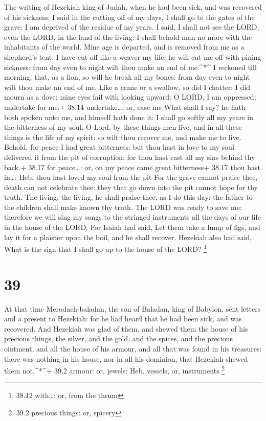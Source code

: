  The writing of Hezekiah king of Judah, when he had been
sick, and was recovered of his sickness:  I said in the
cutting off of my days, I shall go to the gates of the grave: I am
deprived of the residue of my years.  I said, I shall not
see the LORD, even the LORD, in the land of the living: I shall behold
man no more with the inhabitants of the world.  Mine age is
departed, and is removed from me as a shepherd's tent: I have cut off
like a weaver my life: he will cut me off with pining sickness: from day
even to night wilt thou make an end of me.\^{}*\^{}  I
reckoned till morning, that, as a lion, so will he break all my bones:
from day even to night wilt thou make an end of me.  Like a
crane or a swallow, so did I chatter: I did mourn as a dove: mine eyes
fail with looking upward: O LORD, I am oppressed; undertake for me.+
38.14 undertake\ldots: or, ease me  What shall I say? he
hath both spoken unto me, and himself hath done it: I shall go softly
all my years in the bitterness of my soul.  O Lord, by
these things men live, and in all these things is the life of my spirit:
so wilt thou recover me, and make me to live.  Behold, for
peace I had great bitterness: but thou hast in love to my soul delivered
it from the pit of corruption: for thou hast cast all my sins behind thy
back.+ 38.17 for peace\ldots: or, on my peace came great bitterness+
38.17 thou hast in\ldots: Heb. thou hast loved my soul from the pit
 For the grave cannot praise thee, death can not celebrate
thee: they that go down into the pit cannot hope for thy truth.
 The living, the living, he shall praise thee, as I do this
day: the father to the children shall make known thy truth.
 The LORD was ready to save me: therefore we will sing my
songs to the stringed instruments all the days of our life in the house
of the LORD.  For Isaiah had said, Let them take a lump of
figs, and lay it for a plaister upon the boil, and he shall recover.
 Hezekiah also had said, What is the sign that I shall go
up to the house of the LORD? \footnote{38.12 with\ldots: or, from the
  thrum}

\hypertarget{section-38}{%
\section{39}\label{section-38}}

 At that time Merodach-baladan, the son of Baladan, king of
Babylon, sent letters and a present to Hezekiah: for he had heard that
he had been sick, and was recovered.  And Hezekiah was glad
of them, and shewed them the house of his precious things, the silver,
and the gold, and the spices, and the precious ointment, and all the
house of his armour, and all that was found in his treasures: there was
nothing in his house, nor in all his dominion, that Hezekiah shewed them
not.\^{}*\^{}+ 39.2 armour: or, jewels: Heb. vessels, or, instruments
\footnote{39.2 precious things: or, spicery}


